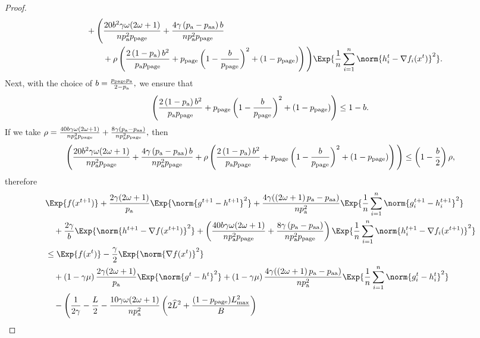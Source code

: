 \documentclass{article}
\newcommand*{\probavailable}{\ensuremath{p_{\textnormal{a}}}}
\newcommand*{\probpairaa}{\ensuremath{p_{\textnormal{aa}}}}
\newcommand*{\probpage}{\ensuremath{p_{\text{page}}}}
\begin{document}
\begin{proof}
\begin{align*}
      &\quad + \Bigg(\frac{20 b^2 \gamma \omega (2 \omega + 1)}{n \probavailable^2 \probpage} + \frac{4 \gamma \left(\probavailable - \probpairaa\right) b}{n \probavailable^2 \probpage} \\
      &\qquad\quad+ \rho \left(\frac{2\left(1 - \probavailable\right)b^2}{\probavailable \probpage} + \probpage\left(1 - \frac{b}{\probpage}\right)^2 + (1 - \probpage)\right)\Bigg)\Exp{\frac{1}{n}\sum_{i=1}^n\norm{h^{t}_i - \nabla f_i(x^{t})}^2}.
    \end{align*}
    Next, with the choice of $b = \frac{\probpage \probavailable}{2 - \probavailable},$ we ensure that
    $$\left(\frac{2\left(1 - \probavailable\right)b^2}{\probavailable \probpage} + \probpage\left(1 - \frac{b}{\probpage}\right)^2 + (1 - \probpage)\right) \leq 1 - b.$$ If we take $\rho = \frac{40 b \gamma \omega (2 \omega + 1)}{n \probavailable^2 \probpage} + \frac{8 \gamma \left(\probavailable - \probpairaa\right)}{n \probavailable^2 \probpage},$ then
    $$\Bigg(\frac{20 b^2 \gamma \omega (2 \omega + 1)}{n \probavailable^2 \probpage} + \frac{4 \gamma \left(\probavailable - \probpairaa\right) b}{n \probavailable^2 \probpage} + \rho \left(\frac{2\left(1 - \probavailable\right)b^2}{\probavailable \probpage} + \probpage\left(1 - \frac{b}{\probpage}\right)^2 + (1 - \probpage)\right)\Bigg) \leq \left(1 - \frac{b}{2}\right)\rho,$$ therefore
    \begin{align*}
      &\Exp{f(x^{t + 1})} + \frac{2\gamma (2 \omega + 1)}{\probavailable} \Exp{\norm{g^{t+1} - h^{t+1}}^2} + \frac{4 \gamma (\left(2 \omega + 1\right)\probavailable - \probpairaa)}{n \probavailable^2} \Exp{\frac{1}{n}\sum_{i=1}^n\norm{g^{t+1}_i - h^{t+1}_i}^2}\\
      &\quad  + \frac{2\gamma}{b} \Exp{\norm{h^{t+1} - \nabla f(x^{t+1})}^2} + \left(\frac{40 b \gamma \omega (2 \omega + 1)}{n \probavailable^2 \probpage} + \frac{8 \gamma \left(\probavailable - \probpairaa\right)}{n \probavailable^2 \probpage}\right) \Exp{\frac{1}{n}\sum_{i=1}^n\norm{h^{t+1}_i - \nabla f_i(x^{t+1})}^2}\\
      &\leq \Exp{f(x^t)} - \frac{\gamma}{2}\Exp{\norm{\nabla f(x^t)}^2} \\
      &\quad + \left(1 - \gamma \mu\right)\frac{2 \gamma (2 \omega + 1)}{\probavailable} \Exp{\norm{g^{t} - h^{t}}^2} + \left(1 - \gamma \mu\right)\frac{4 \gamma (\left(2 \omega + 1\right)\probavailable - \probpairaa)}{n \probavailable^2} \Exp{\frac{1}{n}\sum_{i=1}^n\norm{g^{t}_i - h^{t}_i}^2} \\
      &\quad - \Bigg(\frac{1}{2\gamma} - \frac{L}{2} - \frac{10 \gamma \omega (2 \omega + 1)}{n \probavailable^2} \left(2 \widehat{L}^2 + \frac{(1 - \probpage)L_{\max}^2}{B}\right) \\

\end{align*}
\end{proof}
\end{document}
